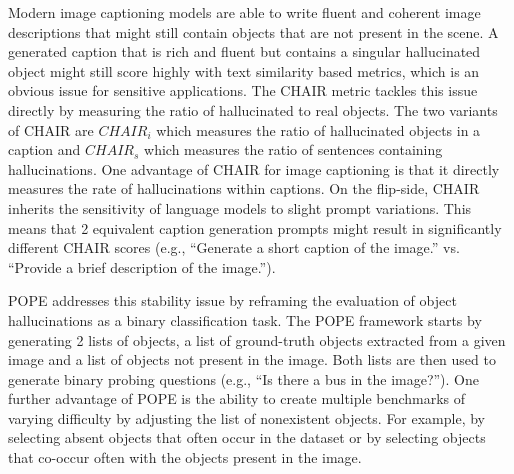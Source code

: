 Modern image captioning models are able to write fluent and coherent image descriptions that might still contain objects that are not present in the scene. A generated caption that is rich and fluent but contains a singular hallucinated object might still score highly with text similarity based metrics, which is an obvious issue for sensitive applications. The CHAIR \cite{rohrbachObjectHallucinationImage2018} metric tackles this issue directly by measuring the ratio of hallucinated to real objects. The two variants of CHAIR are $CHAIR_i$ which measures the ratio of hallucinated objects in a caption and $CHAIR_s$ which measures the ratio of sentences containing hallucinations. One advantage of CHAIR for image captioning is that it directly measures the rate of hallucinations within captions. On the flip-side, CHAIR inherits the sensitivity of language models to slight prompt variations. This means that 2 equivalent caption generation prompts might result in significantly different CHAIR scores (e.g., ``Generate a short caption of the image.'' vs. ``Provide a brief description of the image.'').

POPE \cite{liEvaluatingObjectHallucination2023a} addresses this stability issue by reframing the evaluation of object hallucinations as a binary classification task. The POPE framework starts by generating 2 lists of objects, a list of ground-truth objects extracted from a given image and a list of objects not present in the image. Both lists are then used to generate binary probing questions (e.g., ``Is there a bus in the image?''). One further advantage of POPE is the ability to create multiple benchmarks of varying difficulty by adjusting the list of nonexistent objects. For example, by selecting absent objects that often occur in the dataset or by selecting objects that co-occur often with the objects present in the image.

